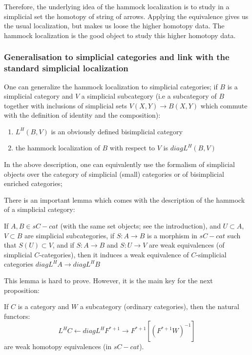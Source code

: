 \begin{refsection}
Therefore, the underlying idea of the hammock localization is to study in a simplicial set the homotopy of string of arrows. Applying the equivalence gives us the usual localization, but makes us loose the higher homotopy data. The hammock localization is the good object to study this higher homotopy data.


\subsubsection{Generalisation to simplicial categories and link with the standard simplicial localization}

One can generalize the hammock localization to simplicial categories; if $B$ is a simplicial category and $V$ a simplicial subcategory (i.e a subcategory of $B$ together with inclusions of simplicial sets $V(X,Y) \rightarrow B(X,Y)$ which commute with the definition of identity and the composition):
\begin{enumerate}
\item $L^H(B,V)$ is an obviously defined bisimplicial category
\item the hammock localization of $B$ with respect to $V$ is $diag L^H(B,V)$
\end{enumerate}

\begin{rmk}
In the above description, one can equivalently use the formalism of simplicial objects over the category of simplicial (small) categories or of bisimplicial enriched categories;
\end{rmk}

There is an important lemma which comes with the description of the hammock of a simplicial category:

\begin{lemma}
If $A, B \in sC-cat$ (with the same set objects; see the introduction), and $U \subset A$, $V \subset B$ are simplicial subcategories, if $S : A \rightarrow B$ is a morphism in $sC-cat$ such that $S(U) \subset V$, and if $S:A \rightarrow B$ and $S: U \rightarrow V$ are weak equivalences (of simplicial $C$-categories), then it induces a weak equivalence of $C$-simplicial categories $diag L^H A \rightarrow diag L^H B$
\end{lemma}

This lemma is hard to prove. However, it is the main key for the next proposition:

\begin{prop}
If $C$ is a category and $W$ a subcategory (ordinary categories), then the natural functors:
\begin{equation}
L^H C \leftarrow diag L^H F^{*+1} \rightarrow F^{*+1} [(F^{*+1}W)^{-1}]
\end{equation}
are weak homotopy equivalences (in $sC-cat$).
\end{prop}


\end{refsection}
